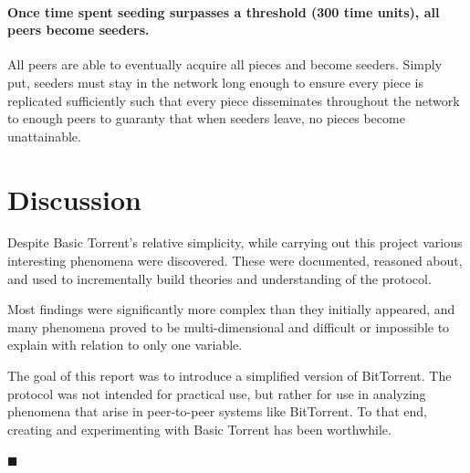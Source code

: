 \documentclass[a4paper,12pt,twocolumn]{article}
\begin{document}
\paragraph{Once time spent seeding surpasses a threshold (300 time units), all peers become seeders.} All peers are able to eventually acquire all pieces and become seeders.
Simply put, seeders must stay in the network long enough to ensure every piece is replicated sufficiently such that every piece disseminates throughout the network to enough peers to guaranty that when seeders leave, no pieces become unattainable.

\section{Discussion}
\label{sec:discussion}
Despite Basic Torrent's relative simplicity, while carrying out this project various interesting phenomena were discovered. 
These were documented, reasoned about, and used to incrementally build theories and understanding of the protocol. 

Most findings were significantly more complex than they initially appeared, and many phenomena proved to be multi-dimensional and difficult or impossible to explain with relation to only one variable.

The goal of this report was to introduce a simplified version of BitTorrent.
The protocol was not intended for practical use, but rather for use in analyzing phenomena that arise in peer-to-peer systems like BitTorrent. 
To that end, creating and experimenting with Basic Torrent has been worthwhile.

\begin{flushright}
$\blacksquare$
\end{flushright}
\end{document}
